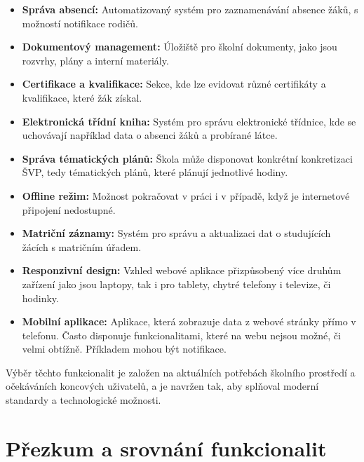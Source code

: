 \documentclass[FM,Proj]{tulthesis}
\begin{document}
\begin{itemize}
    \item \textbf{Správa absencí:} Automatizovaný systém pro zaznamenávání absence žáků, s možností notifikace rodičů.
    
    \item \textbf{Dokumentový management:} Úložiště pro školní dokumenty, jako jsou rozvrhy, plány a interní materiály.
    
    \item \textbf{Certifikace a kvalifikace:} Sekce, kde lze evidovat různé certifikáty a kvalifikace, které žák získal.

    \item \textbf{Elektronická třídní kniha:} Systém pro správu elektronické třídnice, kde se uchovávají například data 
    o absenci žáků a probírané látce.

    \item \textbf{Správa tématických plánů:} Škola může disponovat konkrétní konkretizaci ŠVP, tedy tématických plánů,
    které plánují jednotlivé hodiny.
    
    \item \textbf{Offline režim:} Možnost pokračovat v práci i v případě, když je internetové připojení nedostupné.

    \item \textbf{Matriční záznamy:} Systém pro správu a aktualizaci dat o studujících žácích s matričním úřadem.

    \item \textbf{Responzivní design:} Vzhled webové aplikace přizpůsobený více druhům zařízení jako jsou laptopy,
    tak i pro tablety, chytré telefony i televize, či hodinky.

    \item \textbf{Mobilní aplikace:} Aplikace, která zobrazuje data z webové stránky přímo v telefonu. Často
    disponuje funkcionalitami, které na webu nejsou možné, či velmi obtížně. Příkladem mohou být notifikace.

\end{itemize}

Výběr těchto funkcionalit je založen na aktuálních potřebách školního prostředí a očekáváních koncových uživatelů,
a je navržen tak, aby splňoval moderní standardy a technologické možnosti.

\section{Přezkum a srovnání funkcionalit}
\end{document}
